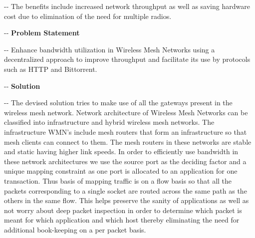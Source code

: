 \documentclass[12pt]{article}
\makeatletter
\newenvironment{indentation}[3]%
	{\par\setlength{\parindent}{#3}
	\setlength{\leftmargin}{#1}       \setlength{\rightmargin}{#1}%
	\advance\linewidth -\leftmargin       \advance\linewidth -\rightmargin%
	\advance\@totalleftmargin\leftmargin  \@setpar{{\@@par}}%
	\parshape 1\@totalleftmargin \linewidth\ignorespaces}{\par}%
\makeatother
\begin{document}
\begin{indentation}{0pt}{0pt}{0pt}
{\normalsize \hspace{1cm}The benefits include increased network throughput as well as saving hardware cost due to elimination of the need for multiple radios.}
\end{indentation}

\begin{indentation}{0pt}{0pt}{0pt}
\vspace{1cm}
\textbf{{{\Large Problem Statement}}}
\end{indentation}
\vspace{0.5cm}

\begin{indentation}{0pt}{0pt}{0pt}
{\normalsize \hspace{1cm} Enhance bandwidth utilization in Wireless Mesh Networks using a decentralized approach to improve throughput and facilitate its use by protocols such as HTTP and Bittorrent.}
\end{indentation}

\begin{indentation}{0pt}{0pt}{0pt}
\vspace{1cm}
\textbf{{{\Large Solution}}}
\end{indentation}
\vspace{0.5cm}
\begin{indentation}{0pt}{0pt}{0pt}
{\normalsize \hspace{1cm} The devised solution tries to make use of all the gateways present in the wireless mesh network. Network architecture of Wireless Mesh Networks can be classified into infrastructure and hybrid wireless mesh networks. The infrastructure WMN's include mesh routers that form an infrastructure so that mesh clients can connect to them. The mesh routers in these networks are stable and static having higher link speeds. In order to efficiently use bandwidth in these network architectures we use the source port as the deciding factor and a unique mapping constraint as one port is allocated to an application for one transaction. Thus basis of mapping traffic is on a flow basis so that all the packets corresponding to a single socket are routed across the same path as the others in the same flow. This helps preserve the sanity of applications as well as not worry about deep packet inspection in order to determine which packet is meant for which application and which host thereby eliminating the need for additional book-keeping on a per packet basis.}
\end{indentation}
\end{document}
